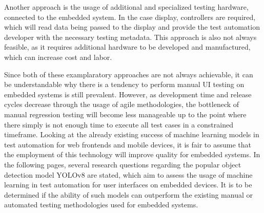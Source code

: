 \documentclass[Proposal,BIC,english,IEEE]{BASE/twbook} %
\begin{document}
Another approach is the usage of additional and specialized testing hardware, connected to the embedded system. In the case display, controllers are required, which will read data being passed to the display and provide the test automation developer with the necessary testing metadata. This approach is also not always feasible, as it requires additional hardware to be developed and manufactured, which can increase cost and labor.

Since both of these examplaratory approaches are not always achievable, it can be understandable why there is a tendency to perform manual UI testing on embedded systems is still prevalent.
However, as development time and release cycles decrease through the usage of agile methodologies, the bottleneck of manual regression testing will become less manageable up to the point where there simply is not enough time to execute all test cases in a constrained timeframe.
Looking at the already existing success of machine learning models in test automation for web frontends and mobile devices, it is fair to assume that the employment of this technology will improve quality for embedded systems. In the following pages, several research questions regarding the popular object detection model YOLOv8 are stated, which aim to assess the usage of machine learning in test automation for user interfaces on embedded devices. It is to be determined if the ability of such models can outperform the existing manual or automated testing methodologies used for embedded systems.
\end{document}
